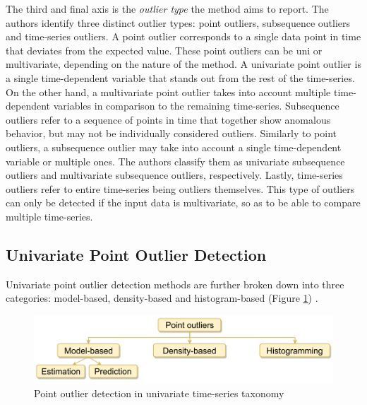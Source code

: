 The third and final axis is the \textit{outlier type} the method aims to report. The authors identify three distinct outlier types: point outliers, subsequence outliers and time-series outliers. A point outlier corresponds to a single data point in time that deviates from the expected value. These point outliers can be uni or multivariate, depending on the nature of the method. A univariate point outlier is a single time-dependent variable that stands out from the rest of the time-series. On the other hand, a multivariate point outlier takes into account multiple time-dependent variables in comparison to the remaining time-series. Subsequence outliers refer to a sequence of points in time that together show anomalous behavior, but may not be individually considered outliers. Similarly to point outliers, a subsequence outlier may take into account a single time-dependent variable or multiple ones. The authors classify them as univariate subsequence outliers and multivariate subsequence outliers, respectively. Lastly, time-series outliers refer to entire time-series being outliers themselves. This type of outliers can only be detected if the input data is multivariate, so as to be able to compare multiple time-series.

\subsection{Univariate Point Outlier Detection}

Univariate point outlier detection methods are further broken down into three categories: model-based, density-based and histogram-based (Figure \ref{fig:point-outlier-taxonomy}) .
\begin{figure}[!htb]
  \begin{center}
    \includegraphics[scale=1]{figures/taxonomy-point-outlier-uni.png}
    \caption[Point outlier detection in univariate time-series taxonomy]{Point outlier detection in univariate time-series taxonomy \cite{Blazquez-Garcia-Review-Anomaly-Detection}}
    \label{fig:point-outlier-taxonomy}
  \end{center}
\end{figure}

